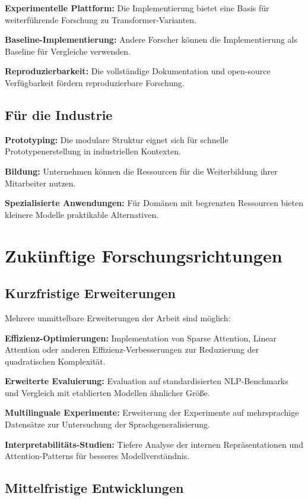\textbf{Experimentelle Plattform:} Die Implementierung bietet eine Basis für weiterführende Forschung zu Transformer-Varianten.

\textbf{Baseline-Implementierung:} Andere Forscher können die Implementierung als Baseline für Vergleiche verwenden.

\textbf{Reproduzierbarkeit:} Die vollständige Dokumentation und open-source Verfügbarkeit fördern reproduzierbare Forschung.

\subsection{Für die Industrie}

\textbf{Prototyping:} Die modulare Struktur eignet sich für schnelle Prototypenerstellung in industriellen Kontexten.

\textbf{Bildung:} Unternehmen können die Ressourcen für die Weiterbildung ihrer Mitarbeiter nutzen.

\textbf{Spezialisierte Anwendungen:} Für Domänen mit begrenzten Ressourcen bieten kleinere Modelle praktikable Alternativen.

\section{Zukünftige Forschungsrichtungen}

\subsection{Kurzfristige Erweiterungen}

Mehrere unmittelbare Erweiterungen der Arbeit sind möglich:

\textbf{Effizienz-Optimierungen:} Implementation von Sparse Attention, Linear Attention oder anderen Effizienz-Verbesserungen zur Reduzierung der quadratischen Komplexität.

\textbf{Erweiterte Evaluierung:} Evaluation auf standardisierten NLP-Benchmarks und Vergleich mit etablierten Modellen ähnlicher Größe.

\textbf{Multilinguale Experimente:} Erweiterung der Experimente auf mehrsprachige Datensätze zur Untersuchung der Sprachgeneralisierung.

\textbf{Interpretabilitäts-Studien:} Tiefere Analyse der internen Repräsentationen und Attention-Patterns für besseres Modellverständnis.

\subsection{Mittelfristige Entwicklungen}

